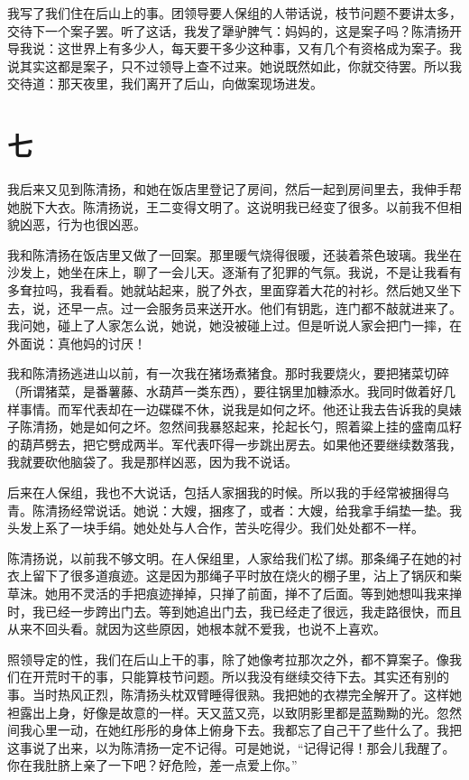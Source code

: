  我写了我们住在后山上的事。团领导要人保组的人带话说，枝节问题不要讲太多，交待下一个案子罢。听了这话，我发了犟驴脾气：妈妈的，这是案子吗？陈清扬开导我说：这世界上有多少人，每天要干多少这种事，又有几个有资格成为案子。我说其实这都是案子，只不过领导上查不过来。她说既然如此，你就交待罢。所以我交待道：那天夜里，我们离开了后山，向做案现场进发。 

\section{七} 
 
我后来又见到陈清扬，和她在饭店里登记了房间，然后一起到房间里去，我伸手帮她脱下大衣。陈清扬说，王二变得文明了。这说明我已经变了很多。以前我不但相貌凶恶，行为也很凶恶。 
 
 我和陈清扬在饭店里又做了一回案。那里暖气烧得很暖，还装着茶色玻璃。我坐在沙发上，她坐在床上，聊了一会儿天。逐渐有了犯罪的气氛。我说，不是让我看有多耷拉吗，我看看。她就站起来，脱了外衣，里面穿着大花的衬衫。然后她又坐下去，说，还早一点。过一会服务员来送开水。他们有钥匙，连门都不敲就进来了。我问她，碰上了人家怎么说，她说，她没被碰上过。但是听说人家会把门一摔，在外面说：真他妈的讨厌！ 
 
 我和陈清扬逃进山以前，有一次我在猪场煮猪食。那时我要烧火，要把猪菜切碎（所谓猪菜，是番薯藤、水葫芦一类东西），要往锅里加糠添水。我同时做着好几样事情。而军代表却在一边碟碟不休，说我是如何之坏。他还让我去告诉我的臭婊子陈清扬，她是如何之坏。忽然间我暴怒起来，抡起长勺，照着粱上挂的盛南瓜籽的葫芦劈去，把它劈成两半。军代表吓得一步跳出房去。如果他还要继续数落我，我就要砍他脑袋了。我是那样凶恶，因为我不说话。 
 
 后来在人保组，我也不大说话，包括人家捆我的时候。所以我的手经常被捆得乌青。陈清扬经常说话。她说：大嫂，捆疼了，或者：大嫂，给我拿手绢垫一垫。我头发上系了一块手绢。她处处与人合作，苦头吃得少。我们处处都不一样。 
 
 陈清扬说，以前我不够文明。在人保组里，人家给我们松了绑。那条绳子在她的衬衣上留下了很多道痕迹。这是因为那绳子平时放在烧火的棚子里，沾上了锅灰和柴草沫。她用不灵活的手把痕迹掸掉，只掸了前面，掸不了后面。等到她想叫我来掸时，我已经一步跨出门去。等到她追出门去，我已经走了很远，我走路很快，而且从来不回头看。就因为这些原因，她根本就不爱我，也说不上喜欢。 
 
 照领导定的性，我们在后山上干的事，除了她像考拉那次之外，都不算案子。像我们在开荒时干的事，只能算枝节问题。所以我没有继续交待下去。其实还有别的事。当时热风正烈，陈清扬头枕双臂睡得很熟。我把她的衣襟完全解开了。这样她袒露出上身，好像是故意的一样。天又蓝又亮，以致阴影里都是蓝黝黝的光。忽然间我心里一动，在她红彤彤的身体上俯身下去。我都忘了自己干了些什么了。我把这事说了出来，以为陈清扬一定不记得。可是她说，“记得记得！那会儿我醒了。你在我肚脐上亲了一下吧？好危险，差一点爱上你。” 
 
